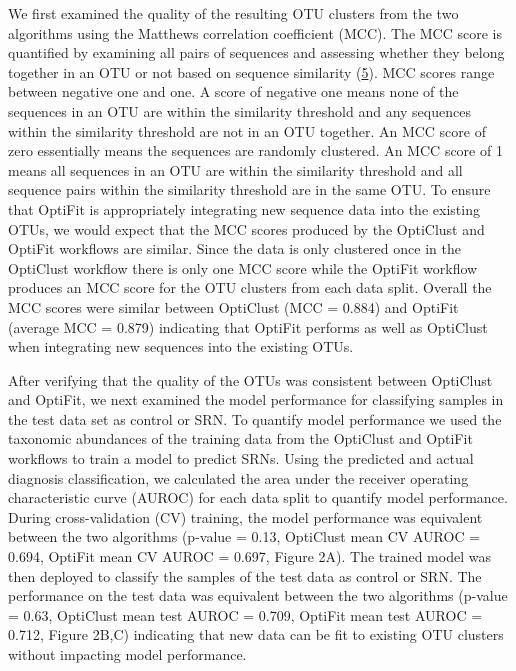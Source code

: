 \documentclass[
]{article}
\begin{document}
We first examined the quality of the resulting OTU clusters from the two
algorithms using the Matthews correlation coefficient (MCC). The MCC
score is quantified by examining all pairs of sequences and assessing
whether they belong together in an OTU or not based on sequence
similarity (\protect\hyperlink{ref-westcott2017}{5}). MCC scores range
between negative one and one. A score of negative one means none of the
sequences in an OTU are within the similarity threshold and any
sequences within the similarity threshold are not in an OTU together. An
MCC score of zero essentially means the sequences are randomly
clustered. An MCC score of 1 means all sequences in an OTU are within
the similarity threshold and all sequence pairs within the similarity
threshold are in the same OTU. To ensure that OptiFit is appropriately
integrating new sequence data into the existing OTUs, we would expect
that the MCC scores produced by the OptiClust and OptiFit workflows are
similar. Since the data is only clustered once in the OptiClust workflow
there is only one MCC score while the OptiFit workflow produces an MCC
score for the OTU clusters from each data split. Overall the MCC scores
were similar between OptiClust (MCC = 0.884) and OptiFit (average MCC =
0.879) indicating that OptiFit performs as well as OptiClust when
integrating new sequences into the existing OTUs.

After verifying that the quality of the OTUs was consistent between
OptiClust and OptiFit, we next examined the model performance for
classifying samples in the test data set as control or SRN. To quantify
model performance we used the taxonomic abundances of the training data
from the OptiClust and OptiFit workflows to train a model to predict
SRNs. Using the predicted and actual diagnosis classification, we
calculated the area under the receiver operating characteristic curve
(AUROC) for each data split to quantify model performance. During
cross-validation (CV) training, the model performance was equivalent
between the two algorithms (p-value = 0.13, OptiClust mean CV AUROC =
0.694, OptiFit mean CV AUROC = 0.697, Figure 2A). The trained model was
then deployed to classify the samples of the test data as control or
SRN. The performance on the test data was equivalent between the two
algorithms (p-value = 0.63, OptiClust mean test AUROC = 0.709, OptiFit
mean test AUROC = 0.712, Figure 2B,C) indicating that new data can be
fit to existing OTU clusters without impacting model performance.
\end{document}
